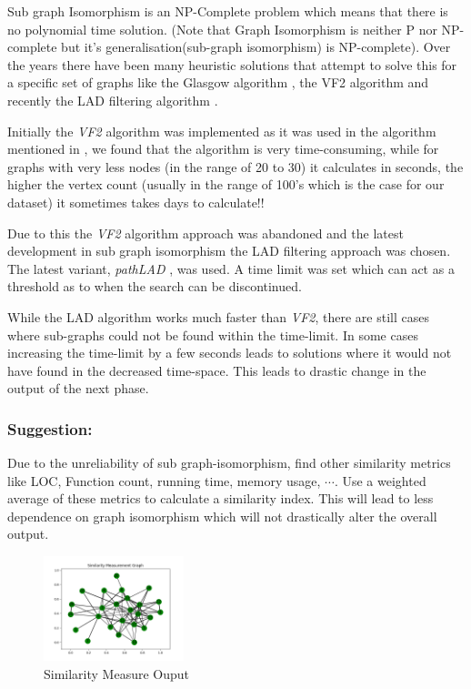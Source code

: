         Sub graph Isomorphism is an NP-Complete problem which means that there is no polynomial time solution. (Note that Graph Isomorphism is neither P nor NP-complete but it's generalisation(sub-graph isomorphism) is NP-complete). Over the years there have been many heuristic solutions that attempt to solve this for a specific set of graphs like the Glasgow algorithm \cite{Glasgow}, the VF2 algorithm \cite{VF} and recently the LAD filtering algorithm \cite{pathLAD}.
        
        Initially the \textit{VF2} algorithm was implemented as it was used in the algorithm mentioned in \cite{GPLAG}, we found that the algorithm is very time-consuming, while for graphs with very less nodes (in the range of 20 to 30) it calculates in seconds, the higher the vertex count (usually in the range of 100's which is the case for our dataset) it sometimes takes days to calculate!!
        
        Due to this the \textit{VF2} algorithm approach was abandoned and the latest development in sub graph isomorphism the LAD filtering approach was chosen. The latest variant, \textit{pathLAD} \cite{pathLAD}, was used. A time limit was set which can act as a threshold as to when the search can be discontinued.
        
        While the LAD algorithm works much faster than \textit{VF2}, there are still cases where sub-graphs could not be found within the time-limit. In some cases increasing the time-limit by a few seconds leads to solutions where it would not have found in the decreased time-space. This leads to drastic change in the output of the next phase.
        
\subsubsection{Suggestion:}
    Due to the unreliability of sub graph-isomorphism, find other similarity metrics like LOC, Function count, running time, memory usage, $\cdots$. Use a weighted average of these metrics to calculate a similarity index. This will lead to less dependence on graph isomorphism which will not drastically alter the overall output.

        \begin{figure}[H]
            \centering
                \centering
                \includegraphics[height=1.2in]{Images/similarity_ensemble_1.png}
                \caption{Similarity Measure Ouput}
        \end{figure}